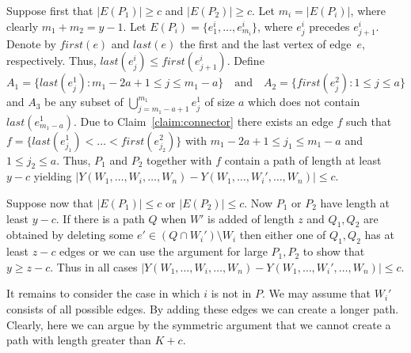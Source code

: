 \documentclass[12pt,reqno]{amsart}
\theoremstyle{remark}
\begin{document}
Suppose first that $|E(P_1)|\ge c$ and $|E(P_2)|\ge c$. 
Let $m_i = |E(P_i)|$, where clearly $m_1+m_2=y-1$. Let $E(P_i) = \{e_1^i,\dots,e_{m_i}^i\}$, where $e_j^i$ precedes $e_{j+1}^i$. Denote by $first(e)$ and $last(e)$ the first and the last vertex of edge~$e$, respectively. Thus, $last(e_j^i) \leq first(e_{j+1}^i)$.
Define
\[
A_1 = \{last(e_j^1): m_1-2a+1\le j\le m_1-a\} \quad \text{and} \quad A_2=\{first(e_j^2):1\le j\le a\}
\]
and $A_3$ be any subset of $\bigcup_{j=m_1-a+1}^{m_1} e_j^1$ of size $a$ which does not contain $last(e^1_{m_1-a})$. Due to Claim~\ref{claim:connector} there exists an edge $f$ such that $f=\{last(e_{j_1}^1)<\dots<first(e_{j_2}^2)\}$ with $m_1-2a+1\le j_1\le m_1-a$ and $1\le j_2\le a$. Thus, $P_1$ and $P_2$ together with $f$ contain a path of length at least $y-c$
yielding $|Y(W_1,\dots,W_i,\dots,W_n)-Y(W_1,\dots,W_i',\dots,W_n) | \le c$. 

Suppose now  that $|E(P_1)| \le c$ or $|E(P_2)|\le c$. Now $P_1$ or $P_2$ have length at least $y-c$. If there is a path $Q$ when $W'$ is added of length $z$ and $Q_1,Q_2$ are obtained by deleting some $e'\in (Q\cap W_i')\setminus W_i$ then either one of $Q_1,Q_2$ has at least $z-c$ edges or we can use the argument for large $P_1,P_2$ to show that $y\geq z-c$. Thus in all cases $|Y(W_1,\dots,W_i,\dots,W_n)-Y(W_1,\dots,W_i',\dots,W_n) | \le c$.

It remains to consider the case in which $i$ is not in $P$. We may assume that $W_i'$ consists of all possible edges. By adding these edges we can create a longer path. Clearly, here we can argue by the symmetric argument that we cannot create a path with length greater than $K+c$.
\end{document}
